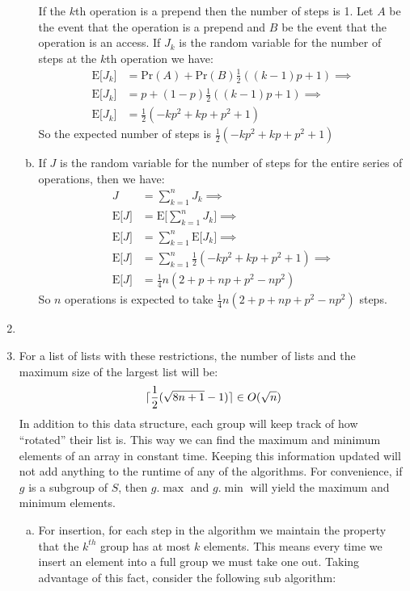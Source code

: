\documentclass[letterpaper,10pt]{article}
\DeclarePairedDelimiter{\ceil}{\lceil}{\rceil}
\begin{document}
\begin{enumerate}
\begin{enumerate}[a)]
		If the $k$th operation is a prepend then the number of steps is 1. Let $A$ be the event that the operation is a prepend and $B$ be the event that the operation is an access. If $J_k$ is the random variable for the number of steps at the $k$th operation we have: 
		\begin{align*}
			\text{E}\big[J_k\big] & = \text{Pr}(A) + \text{Pr}(B)\frac{1}{2} ((k-1)p + 1)  \implies \\
			\text{E}\big[J_k\big] & = p + (1-p)\frac{1}{2} ((k-1)p + 1)  \implies \\
			\text{E}\big[J_k\big] & = \frac{1}{2} (-k p^2+k p+p^2+1) 
		\end{align*}
		So the expected number of steps is $\frac{1}{2} (-k p^2+k p+p^2+1) $
		\item If $J$ is the random variable for the number of steps for the entire series of operations, then we have:
		\begin{align*}
			J & = \sum^{n}_{k=1} J_k \implies \\
			\text{E}\big[J\big] & = \text{E}\Bigg[ \sum^{n}_{k=1} J_k \Bigg] \implies \\
			\text{E}\big[J\big] & = \sum^{n}_{k=1} \text{E}\big[ J_k \big] \implies \\
			\text{E}\big[J\big] & = \sum^{n}_{k=1} \frac{1}{2} (-k p^2+k p+p^2+1)  \implies \\
			\text{E}\big[J\big] & = \frac{1}{4} n (2+p+n p+p^2-n p^2)
		\end{align*}
		So $n$ operations is expected to take $\frac{1}{4} n (2+p+n p+p^2-n p^2)$ steps.
	\end{enumerate}
	\clearpage

	\item

	\clearpage
	\item 
		For a list of lists with these restrictions, the number of lists and the maximum size of the largest list will be:
		$$ \ceil{ \frac{1}{2} (\sqrt{8n + 1} - 1)} \in O(\sqrt{n}) $$
		In addition to this data structure, each group will keep track of how ``rotated'' their list is. This way we can find the maximum and minimum elements of an array in constant time. Keeping this information updated will not add anything to the runtime of any of the algorithms. For convenience, if $g$ is a subgroup of $S$, then $g.\max$ and $g.\min$ will yield the maximum and minimum elements.

	\begin{enumerate}[a)]
		\item For insertion, for each step in the algorithm we maintain the property that the $k^{th}$ group has at most $k$ elements. This means every time we insert an element into a full group we must take one out. Taking advantage of this fact, consider the following sub algorithm:


\end{enumerate}
\end{enumerate}
\end{document}
